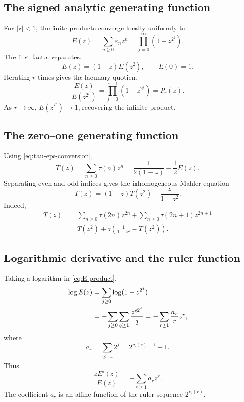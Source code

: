 \documentclass[11pt,oneside]{article}
\theoremstyle{definition}
\theoremstyle{remark}
\newcommand{\vtwo}{v_2}
\newcommand{\eps}{\varepsilon}
\begin{document}
\subsection{The signed analytic generating function}

For $|z|<1$, the finite products converge locally uniformly to
\begin{equation}\label{eq:E-product}
 E(z)=\sum_{n\ge0}\eps_nz^n
     =\prod_{j=0}^{\infty}(1-z^{2^j}).
\end{equation}
The first factor separates:
\begin{equation}\label{eq:E-mahler}
 \boxed{\qquad E(z)=(1-z)E(z^2),\qquad E(0)=1.\qquad}
\end{equation}
Iterating $r$ times gives the lacunary quotient
\begin{equation}\label{eq:lacunary-quotient}
 \frac{E(z)}{E(z^{2^r})}=\prod_{j=0}^{r-1}(1-z^{2^j})=P_r(z).
\end{equation}
As $r\to\infty$, $E(z^{2^r})\to1$, recovering the infinite product.

\subsection{The zero--one generating function}

Using \cref{eq:tau-eps-conversion},
\begin{equation}\label{eq:T-from-E}
 \boxed{\qquad
 T(z)=\sum_{n\ge0}\tau(n)z^n
 =\frac1{2(1-z)}-\frac12E(z).
 \qquad}
\end{equation}
Separating even and odd indices gives the inhomogeneous Mahler equation
\begin{equation}\label{eq:T-mahler}
 \boxed{\qquad
 T(z)=(1-z)T(z^2)+\frac{z}{1-z^2}.
 \qquad}
\end{equation}
Indeed,
\begin{align*}
 T(z)
 &=\sum_{n\ge0}\tau(2n)z^{2n}
   +\sum_{n\ge0}\tau(2n+1)z^{2n+1}\\
 &=T(z^2)+z\left(\frac1{1-z^2}-T(z^2)\right).
\end{align*}

\subsection{Logarithmic derivative and the ruler function}

Taking a logarithm in \cref{eq:E-product},
\begin{align}
 \log E(z)
 &=\sum_{j\ge0}\log(1-z^{2^j})\notag\\
 &=-\sum_{j\ge0}\sum_{q\ge1}\frac{z^{q2^j}}q
 =-\sum_{r\ge1}\frac{a_r}{r}z^r,\label{eq:log-E}
\end{align}
where
\begin{equation}\label{eq:ruler-coeff}
 a_r=\sum_{2^j\mid r}2^j=2^{\vtwo(r)+1}-1.
\end{equation}
Thus
\begin{equation}\label{eq:log-derivative-E}
 \frac{zE'(z)}{E(z)}=-\sum_{r\ge1}a_rz^r.
\end{equation}
The coefficient $a_r$ is an affine function of the ruler sequence
$2^{\vtwo(r)}$.
\end{document}
